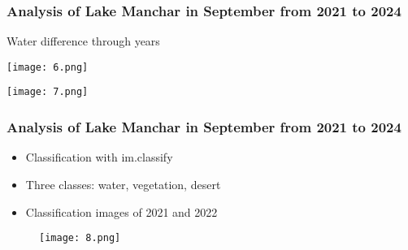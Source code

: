 \documentclass{beamer}
\begin{document}
\begin{frame}
  \frametitle{\small Analysis of Lake Manchar in September from 2021 to 2024} 

    \centering
    \small Water difference through years \\
    
   \begin{minipage}{0.48\textwidth}
    \centering
    \texttt{[image: 6.png]}
  \end{minipage}
  \hfill
  \begin{minipage}{0.48\textwidth}
    \centering
    \texttt{[image: 7.png]}
  \end{minipage}
  
\end{frame}  

  

\begin{frame}
  \frametitle{\small Analysis of Lake Manchar in September from 2021 to 2024} 

    \begin{itemize}
        \item \small Classification with im.classify
        \item \small Three classes: water, vegetation, desert
        \item \small Classification images of 2021 and 2022
    \end{itemize}
    
    \begin{figure}
        \centering
        \texttt{[image: 8.png]}
        \label{fig:enter-label}
    \end{figure}
  
\end{frame}
\end{document}
